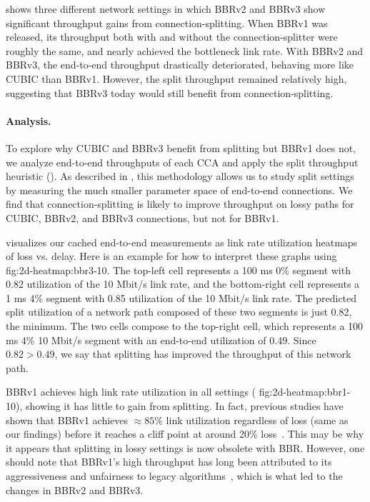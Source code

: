  shows three different network settings in which BBRv2
and BBRv3 show significant throughput gains from connection-splitting.
 When BBRv1 was released, its throughput both with and
 without the connection-splitter were roughly the same, and nearly achieved the
 bottleneck link rate. With BBRv2 and BBRv3, the end-to-end throughput
 drastically deteriorated, behaving more like CUBIC than BBRv1. However, the
 split throughput remained relatively high, suggesting that BBRv3 today would
 still benefit from connection-splitting.

\paragraph{Analysis.}
To explore why CUBIC and BBRv3 benefit from splitting but BBRv1 does not, we
analyze end-to-end throughputs of each CCA and apply the split throughput
heuristic (). As described in ,
this methodology allows us to study split settings by measuring the much smaller
parameter space of end-to-end connections. We find that connection-splitting is
likely to improve throughput on lossy paths for CUBIC, BBRv2, and BBRv3
connections, but not for BBRv1.

 visualizes our cached end-to-end measurements as link rate
 utilization heatmaps of loss vs. delay.
 Here is an example for how to interpret these graphs using \Cref
 {fig:2d-heatmap:bbr3-10}. The top-left cell represents a 100 ms 0\% segment
 with 0.82 utilization of the 10 Mbit/s link rate, and the bottom-right cell
 represents a 1 ms 4\% segment with 0.85 utilization of the 10 Mbit/s link
 rate. The predicted split utilization of a network path composed of these two
 segments is just 0.82, the minimum. The two cells compose to the top-right
 cell, which represents a 100 ms 4\% 10 Mbit/s segment with an end-to-end
 utilization of 0.49. Since $0.82>0.49$, we say that splitting has improved the
 throughput of this network path.

BBRv1 achieves high link rate utilization in all settings (\Cref
{fig:2d-heatmap:bbr1-10}), showing it has little to gain from splitting.
In fact, previous studies have shown that BBRv1 achieves $\approx\!85\%$
link utilization regardless of loss (same as our findings) before it reaches
a cliff point at around 20\% loss~\cite{cao2019use,cardwell2017bbr}.
This may be why it appears that splitting in lossy settings is now obsolete with BBR.
However, one should note that BBRv1's high throughput has long been attributed
to its aggressiveness and unfairness to legacy algorithms~\cite
{ware2019modeling,cao2019use}, which is what led to the changes in BBRv2 and
BBRv3.

